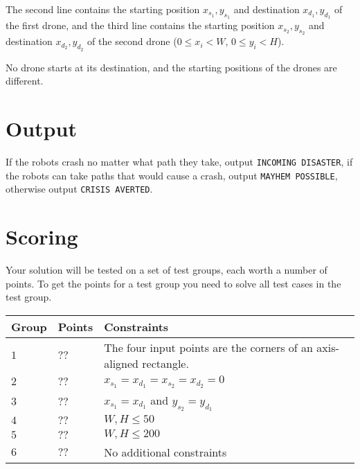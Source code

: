 The second line contains the starting position $x_{s_1}, y_{s_1}$ and destination $x_{d_1}, y_{d_1}$ of the first drone,
and the third line contains the starting position $x_{s_2}, y_{s_2}$ and destination $x_{d_2}, y_{d_2}$ of the second drone ($0 \le x_i < W$, $0 \le y_i < H$).

No drone starts at its destination, and the starting positions of the drones are different.

\section*{Output}
If the robots crash no matter what path they take, output \texttt{INCOMING DISASTER},
if the robots can take paths that would cause a crash, output \texttt{MAYHEM POSSIBLE},
otherwise output \texttt{CRISIS AVERTED}.

\section*{Scoring}
Your solution will be tested on a set of test groups, each worth a number of points.
To get the points for a test group you need to solve all test cases in the test group.

\noindent
\begin{tabular}{| l | l | l |}
  \hline
  Group & Points & Constraints \\ \hline
  $1$    & $??$        &  The four input points are the corners of an axis-aligned rectangle. \\ \hline
  $2$    & $??$        &  $x_{s_1} = x_{d_1} = x_{s_2} = x_{d_2} = 0$ \\ \hline
  $3$    & $??$        &  $x_{s_1} = x_{d_1}$ and $y_{s_2} = y_{d_1}$ \\ \hline
  $4$    & $??$        &  $W, H \le 50$ \\ \hline
  $5$    & $??$        &  $W, H \le 200$ \\ \hline
  $6$    & $??$        &  No additional constraints \\ \hline
\end{tabular}
